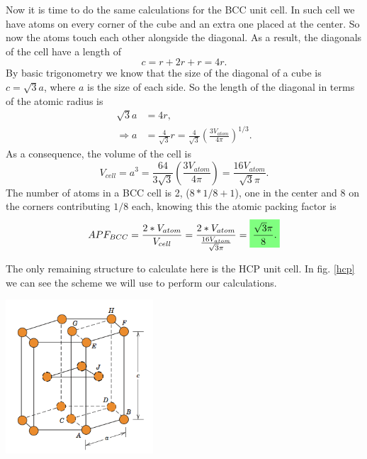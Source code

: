 \begin{questions}
\begin{solution}
  Now it is time to do the same calculations for the BCC unit cell. In such cell we have atoms on every corner of the cube and an extra one placed at the center. So now the atoms touch each other alongside the diagonal. As a result, the diagonals of the cell have a length of
  \begin{equation*}
    c = r + 2r + r = 4r.
  \end{equation*}
  By basic trigonometry we know that the size of the diagonal of a cube is $c = \sqrt{3} a$, where $a$ is the size of each side. So the length of the diagonal in terms of the atomic radius is
  \begin{equation}
    \begin{aligned}
      \sqrt{3} a &= 4 r,\\
      \Rightarrow a &= \frac{4}{\sqrt{3}}r = \frac{4}{\sqrt{3}}\left(\frac{3V_{atom}}{4\pi}\right)^{1/3}.
    \end{aligned}
  \end{equation}
  As a consequence, the volume of the cell is
  \begin{equation}
    V_{cell} = a^3 = \frac{64}{3\sqrt{3}}\left(\frac{3V_{atom}}{4\pi}\right) = \frac{16V_{atom}}{\sqrt{3}\pi}.
  \end{equation}
  The number of atoms in a BCC cell is 2, ($8*1/8 + 1$), one in the center and 8 on the corners contributing $1/8$ each, knowing this the atomic packing factor is
  \begin{equation}
    APF_{BCC} = \frac{2*V_{atom}}{V_{cell}} = \frac{2*V_{atom}}{\frac{16V_{atom}}{\sqrt{3}\pi}} = \hlgreen{\frac{\sqrt{3}\pi}{8}.}
  \end{equation}
\end{solution}

\begin{solution}
The only remaining structure to calculate here is the HCP unit cell. In fig. \ref{hcp} we can see the scheme we will use to perform our calculations.
  \begin{center}
    \includegraphics[width=55mm]{hpc}
  \end{center}


\end{solution}
\end{questions}
